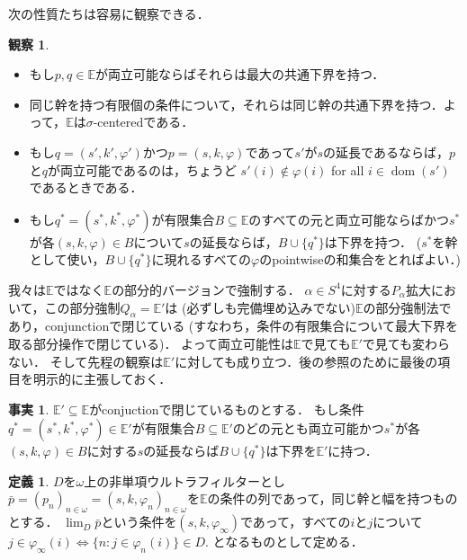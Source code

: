 \documentclass[uplatex,dvipdfmx]{jsarticle}
\newcommand{\dom}{\operatorname{dom}}
\newcommand{\Eor}{\mathbb{E}}
\theoremstyle{definition}
\newtheorem{defi}[thm]{定義}
\newtheorem{fact}[thm]{事実}
\newtheorem{observation}[thm]{観察}
\begin{document}
	次の性質たちは容易に観察できる．
	\begin{observation}
	\begin{itemize}
		\item \label{compat.a} もし$p,q\in \Eor$が両立可能ならばそれらは最大の共通下界を持つ． 
		\item \label{compat.b} 同じ幹を持つ有限個の条件について，それらは同じ幹の共通下界を持つ．よって，$\Eor$は$\sigma$-centeredである．
		\item もし$q=(s',k',\varphi')$かつ$p=(s,k,\varphi)$であって$s'$が$s$の延長であるならば，$p$と$q$が両立可能であるのは，ちょうど
		$s'(i)\notin \varphi(i)$ for all $i\in\dom(s')$であるときである．
		\item  \label{compat.c}  もし$q^* =(s^*,k^*,\varphi^ *)$が有限集合$B\subseteq \Eor$のすべての元と両立可能ならばかつ$s^*$が各$(s,k,\varphi)\in B$について$s$の延長ならば，$B\cup \{q^*\}$は下界を持つ． 
		($s^*$を幹として使い，$B\cup \{q^ *\}$に現れるすべての$\varphi$のpointwiseの和集合をとればよい．)
	\end{itemize}
	\end{observation}

	我々は$\Eor$ではなく$\Eor$の部分的バージョンで強制する．
	$\alpha \in S^4$に対する$P_\alpha$拡大において，この部分強制$Q_\alpha=\Eor'$は
	(必ずしも完備埋め込みでない)$\Eor$の部分強制法であり，conjunctionで閉じている
	(すなわち，条件の有限集合について最大下界を取る部分操作で閉じている)．
	よって両立可能性は$\Eor$で見ても$\Eor'$で見ても変わらない．
	そして先程の観察は$\Eor'$に対しても成り立つ．後の参照のために最後の項目を明示的に主張しておく．
	
	
	\begin{fact}\label{fact:bla}
		$\Eor'\subseteq \Eor$がconjuctionで閉じているものとする．
		もし条件$q^* =(s^*,k^*,\varphi^ *) \in \Eor'$が有限集合$B\subseteq \Eor'$のどの元とも両立可能かつ$s^*$が各$(s,k,\varphi)\in B$に対する$s$の延長ならば$B\cup \{q^*\}$は下界を$\Eor'$に持つ． 
	\end{fact}


	\begin{defi}
		$D$を$\omega$上の非単項ウルトラフィルターとし$\bar p = 
		(p_n)_{n\in \omega} = (s,k,\varphi_n)_{n\in \omega}$を$\Eor$の条件の列であって，同じ幹と幅を持つものとする． 
		$\lim_D\bar p$という条件を$(s,k,\varphi_\infty)$であって，すべての$i$と$j$について
		$
		j\in \varphi_\infty(i) \Leftrightarrow \{ n: j\in \varphi_n(i)\}\in D
		$.
		となるものとして定める．
	\end{defi}
\end{document}
